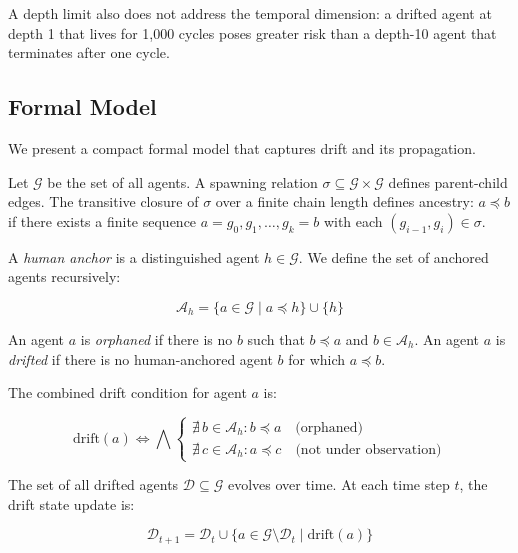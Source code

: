 A depth limit also does not address the temporal dimension: a drifted agent at depth 1 that lives for 1,000 cycles poses greater risk than a depth-10 agent that terminates after one cycle.

\subsection{Formal Model}

We present a compact formal model that captures drift and its propagation.

Let $\mathcal{G}$ be the set of all agents. A spawning relation $\sigma \subseteq \mathcal{G} \times \mathcal{G}$ defines parent-child edges. The transitive closure of $\sigma$ over a finite chain length defines ancestry: $a \preceq b$ if there exists a finite sequence $a = g_0, g_1, \dots, g_k = b$ with each $(g_{i-1}, g_i) \in \sigma$.

A \emph{human anchor} is a distinguished agent $h \in \mathcal{G}$. We define the set of anchored agents recursively:

\begin{equation}
\mathcal{A}_h = \{a \in \mathcal{G} \mid a \preceq h \} \cup \{h\}
\end{equation}

An agent $a$ is \emph{orphaned} if there is no $b$ such that $b \preceq a$ and $b \in \mathcal{A}_h$. An agent $a$ is \emph{drifted} if there is no human-anchored agent $b$ for which $a \preceq b$.

The combined drift condition for agent $a$ is:

\begin{equation}
\text{drift}(a) \iff \bigwedge \left\{
\begin{array}{l}
\nexists\, b \in \mathcal{A}_h : b \preceq a \quad \text{(orphaned)} \\[4pt]
\nexists\, c \in \mathcal{A}_h : a \preceq c \quad \text{(not under observation)}
\end{array}
\right.
\end{equation}

The set of all drifted agents $\mathcal{D} \subseteq \mathcal{G}$ evolves over time. At each time step $t$, the drift state update is:

\begin{equation}
\mathcal{D}_{t+1} = \mathcal{D}_t \cup \{a \in \mathcal{G} \setminus \mathcal{D}_t \mid \text{drift}(a)\}
\end{equation}

